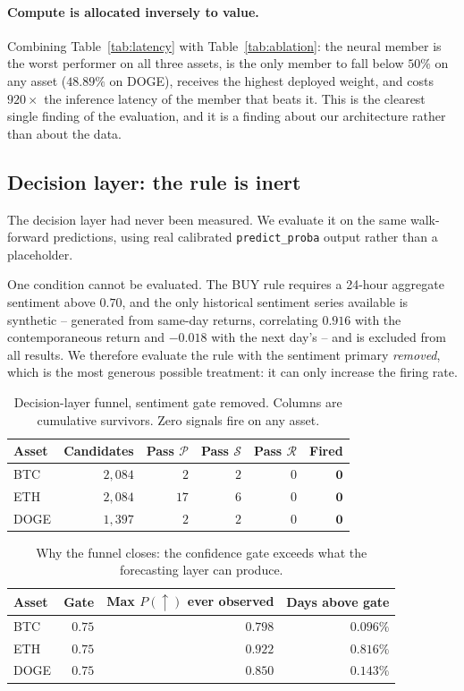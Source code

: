 \documentclass[preprint,12pt,authoryear]{elsarticle}
\begin{document}
\paragraph{Compute is allocated inversely to value.} Combining
Table~\ref{tab:latency} with Table~\ref{tab:ablation}: the neural member is the
worst performer on all three assets, is the only member to fall below $50\%$ on
any asset ($48.89\%$ on DOGE), receives the highest deployed weight, and costs
$920\times$ the inference latency of the member that beats it. This is the
clearest single finding of the evaluation, and it is a finding about our
architecture rather than about the data.

\subsection{Decision layer: the rule is inert}
\label{ssec:decision}

The decision layer had never been measured. We evaluate it on the same
walk-forward predictions, using real calibrated \texttt{predict\_proba} output
rather than a placeholder.

One condition cannot be evaluated. The BUY rule requires a 24-hour aggregate
sentiment above $0.70$, and the only historical sentiment series available is
synthetic -- generated from same-day returns, correlating $0.916$ with the
contemporaneous return and $-0.018$ with the next day's -- and is excluded from
all results. We therefore evaluate the rule with the sentiment primary
\emph{removed}, which is the most generous possible treatment: it can only
increase the firing rate.

\begin{table}[t]\centering\small
\caption{Decision-layer funnel, sentiment gate removed. Columns are cumulative
survivors. Zero signals fire on any asset.}
\label{tab:decision}
\begin{tabular}{@{}lrrrrr@{}}
\toprule
Asset & Candidates & Pass $\mathcal{P}$ & Pass $\mathcal{S}$ & Pass $\mathcal{R}$ & Fired \\
\midrule
BTC   & $2{,}084$ & $2$  & $2$ & $0$ & $\mathbf{0}$ \\
ETH   & $2{,}084$ & $17$ & $6$ & $0$ & $\mathbf{0}$ \\
DOGE  & $1{,}397$ & $2$  & $2$ & $0$ & $\mathbf{0}$ \\
\bottomrule
\end{tabular}
\end{table}

\begin{table}[t]\centering\small
\caption{Why the funnel closes: the confidence gate exceeds what the forecasting
layer can produce.}
\label{tab:gate}
\begin{tabular}{@{}lrrr@{}}
\toprule
Asset & Gate & Max $P(\uparrow)$ ever observed & Days above gate \\
\midrule
BTC   & $0.75$ & $0.798$ & $0.096\%$ \\
ETH   & $0.75$ & $0.922$ & $0.816\%$ \\
DOGE  & $0.75$ & $0.850$ & $0.143\%$ \\
\bottomrule
\end{tabular}
\end{table}
\end{document}
